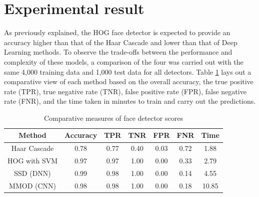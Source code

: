 \documentclass[conference]{IEEEtran}
\begin{document}


\section{Experimental result} \label{s-exp-res}


As previously explained, the HOG face detector is expected to provide an accuracy higher than that of the Haar Cascade and lower than that of Deep Learning methods. To observe the trade-offs between the performance and complexity of these models, a comparison of the four was carried out with the same 4,000 training data and 1,000 test data for all detectors. Table \ref{tab: face} lays out a comparative view of each method based on the overall accuracy, the true positive rate (TPR), true negative rate (TNR), false positive rate (FPR), false negative rate (FNR), and the time taken in minutes to train and carry out the predictions.

\begin{table}[htp]
\caption{Comparative measures of face detector scores}
\begin{center}
\renewcommand{\arraystretch}{1.5}
\begin{tabular}{|c|c|c|c|c|c|c|}
\hline
Method & Accuracy & TPR & TNR & FPR & FNR & Time\\ \hline
Haar Cascade & 0.78 & 0.77 & 0.40 & 0.03 & 0.72 & 1.88 \\ \hline
HOG with SVM & 0.97 & 0.97 & 1.00 & 0.00 & 0.33 & 2.79 \\ \hline
SSD (DNN) & 0.99 & 0.98 & 1.00 & 0.00 & 0.14 & 4.55\\ \hline
MMOD (CNN) & 0.98 & 0.98 & 1.00 & 0.00 & 0.18 & 10.85\\ \hline
\end{tabular}
\end{center}
\label{tab: face}
\end{table}%
\end{document}
